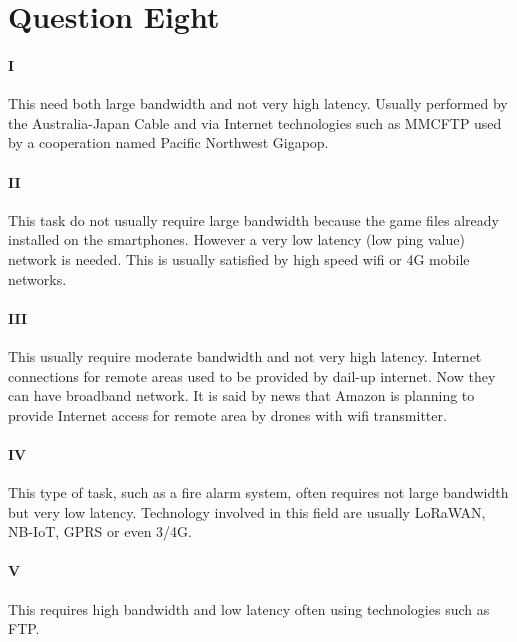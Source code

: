 \documentclass[paper=a4, fontsize=11pt]{scrartcl} %
\numberwithin{equation}{section} %
\numberwithin{figure}{section} %
\numberwithin{table}{section} %
\begin{document}
\section{Question Eight }

\paragraph{I}
This need both large bandwidth and not very high latency. Usually performed by the Australia-Japan Cable and via Internet technologies such as MMCFTP used by a cooperation named Pacific Northwest Gigapop.
\paragraph{II}
This task do not usually require large bandwidth because the game files already installed on the smartphones. However a very low latency (low ping value) network is needed. This is usually satisfied by high speed wifi or 4G mobile networks.
\paragraph{III}
This usually require moderate bandwidth and not very high latency. Internet connections for remote areas used to be provided by dail-up internet. Now they can have broadband network. It is said by news that Amazon is planning to provide Internet access for remote area by drones with wifi transmitter.
\paragraph{IV}
This type of task, such as a fire alarm system, often requires not large bandwidth but very low latency. Technology involved in this field are usually LoRaWAN, NB-IoT, GPRS or even 3/4G.

\paragraph{V}
This requires high bandwidth and low latency often using technologies such as FTP.
\end{document}
